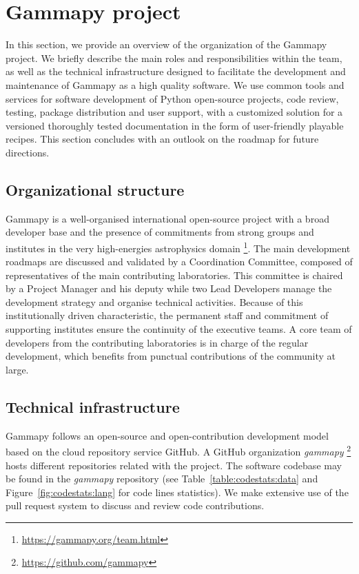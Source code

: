 \section{Gammapy project}
\label{sec:gammapy-project}

In this section, we provide an overview of the organization of the Gammapy project. We briefly describe the main roles and responsibilities within the team, as well as the technical infrastructure designed to facilitate the development and maintenance of Gammapy as a high quality software. We use common tools and services for software development of Python open-source projects, code review, testing, package distribution and user support, with a customized solution for a versioned thoroughly tested documentation in the form of user-friendly playable recipes. This section concludes with an outlook on the roadmap for future directions.

\subsection{Organizational structure}
\label{ssec:organizational-structure}

Gammapy is a well-organised international open-source project with a broad developer base and the presence of commitments from strong groups and institutes in the very high-energies astrophysics domain \footnote{\url{https://gammapy.org/team.html}}. The main development roadmaps are discussed and validated by a Coordination Committee, composed of representatives of the main contributing laboratories. This committee is chaired by a Project Manager and his deputy while two Lead Developers manage the development strategy and organise technical activities. Because of this institutionally driven characteristic, the permanent staff and commitment of supporting institutes ensure the continuity of the executive teams. A core team of developers from the contributing laboratories is in charge of the regular development, which benefits from punctual contributions of the community at large.

\subsection{Technical infrastructure}
\label{ssec:technical-infrastructure}

Gammapy follows an open-source and open-contribution development model based on the cloud repository service GitHub. A GitHub organization \textit{gammapy} \footnote{\url{https://github.com/gammapy}} hosts different repositories related with the project. The software codebase may be found in the \textit{gammapy} repository (see Table~\ref{table:codestats:data} and Figure~\ref{fig:codestats:lang} for code lines statistics). We make extensive use of the pull request system to discuss and review code contributions.

